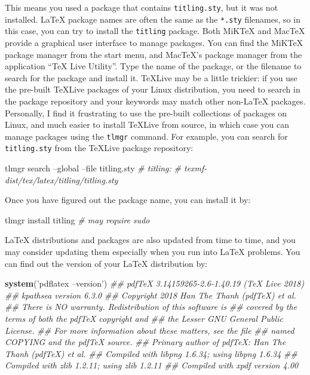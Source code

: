 \documentclass[
  12pt,
]{krantz}
\makeatletter
\newenvironment{Shaded}{\begin{snugshade}}{\end{snugshade}}
\newcommand{\CommentTok}[1]{\textcolor[rgb]{0.56,0.35,0.01}{\textit{#1}}}
\newcommand{\ExtensionTok}[1]{#1}
\newcommand{\KeywordTok}[1]{\textcolor[rgb]{0.13,0.29,0.53}{\textbf{#1}}}
\newcommand{\NormalTok}[1]{#1}
\newcommand{\StringTok}[1]{\textcolor[rgb]{0.31,0.60,0.02}{#1}}
\newenvironment{kframe}{%
\medskip{}
\setlength{\fboxsep}{.8em}
 \def\at@end@of@kframe{}%
 \ifinner\ifhmode%
  \def\at@end@of@kframe{\end{minipage}}%
  \begin{minipage}{\columnwidth}%
 \fi\fi%
 \def\FrameCommand##1{\hskip\@totalleftmargin \hskip-\fboxsep
 \colorbox{shadecolor}{##1}\hskip-\fboxsep
     \hskip-\linewidth \hskip-\@totalleftmargin \hskip\columnwidth}%
 \MakeFramed {\advance\hsize-\width
   \@totalleftmargin\z@ \linewidth\hsize
   \@setminipage}}%
 {\par\unskip\endMakeFramed%
 \at@end@of@kframe}
\renewenvironment{Shaded}{\begin{kframe}}{\end{kframe}}
\theoremstyle{definition}
\theoremstyle{definition}
\theoremstyle{definition}
\theoremstyle{remark}
\makeatother
\begin{document}
This means you used a package that contains \texttt{titling.sty}, but it was not installed. LaTeX package names are often the same as the \texttt{*.sty} filenames, so in this case, you can try to install the \texttt{titling} package. Both MiKTeX and MacTeX provide a graphical user interface to manage packages. You can find the MiKTeX package manager from the start menu, and MacTeX's package manager from the application ``TeX Live Utility''. Type the name of the package, or the filename to search for the package and install it. TeXLive may be a little trickier: if you use the pre-built TeXLive packages of your Linux distribution, you need to search in the package repository and your keywords may match other non-LaTeX packages. Personally, I find it frustrating to use the pre-built collections of packages on Linux, and much easier to install TeXLive from source, in which case you can manage packages using the \texttt{tlmgr} command. For example, you can search for \texttt{titling.sty} from the TeXLive package repository:

\begin{Shaded}
\begin{Highlighting}[]
\ExtensionTok{tlmgr}\NormalTok{ search --global --file titling.sty}
\CommentTok{# titling:}
\CommentTok{#    texmf-dist/tex/latex/titling/titling.sty}
\end{Highlighting}
\end{Shaded}

Once you have figured out the package name, you can install it by:

\begin{Shaded}
\begin{Highlighting}[]
\ExtensionTok{tlmgr}\NormalTok{ install titling  }\CommentTok{# may require sudo}
\end{Highlighting}
\end{Shaded}

LaTeX distributions and packages are also updated from time to time, and you may consider updating them especially when you run into LaTeX problems. You can find out the version of your LaTeX distribution by:

\begin{Shaded}
\begin{Highlighting}[]
\KeywordTok{system}\NormalTok{(}\StringTok{'pdflatex --version'}\NormalTok{)}
\CommentTok{## pdfTeX 3.14159265-2.6-1.40.19 (TeX Live 2018)}
\CommentTok{## kpathsea version 6.3.0}
\CommentTok{## Copyright 2018 Han The Thanh (pdfTeX) et al.}
\CommentTok{## There is NO warranty.  Redistribution of this software is}
\CommentTok{## covered by the terms of both the pdfTeX copyright and}
\CommentTok{## the Lesser GNU General Public License.}
\CommentTok{## For more information about these matters, see the file}
\CommentTok{## named COPYING and the pdfTeX source.}
\CommentTok{## Primary author of pdfTeX: Han The Thanh (pdfTeX) et al.}
\CommentTok{## Compiled with libpng 1.6.34; using libpng 1.6.34}
\CommentTok{## Compiled with zlib 1.2.11; using zlib 1.2.11}
\CommentTok{## Compiled with xpdf version 4.00}
\end{Highlighting}
\end{Shaded}
\end{document}
